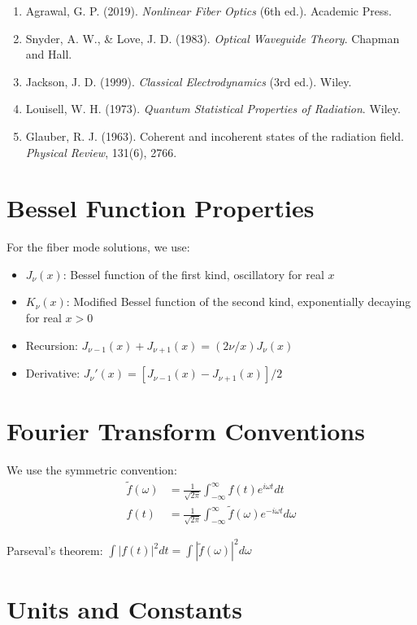 \documentclass[12pt,a4paper]{article}
\begin{document}
\begin{enumerate}[leftmargin=*]
\item Agrawal, G. P. (2019). \textit{Nonlinear Fiber Optics} (6th ed.). Academic Press.
\item Snyder, A. W., \& Love, J. D. (1983). \textit{Optical Waveguide Theory}. Chapman and Hall.
\item Jackson, J. D. (1999). \textit{Classical Electrodynamics} (3rd ed.). Wiley.
\item Louisell, W. H. (1973). \textit{Quantum Statistical Properties of Radiation}. Wiley.
\item Glauber, R. J. (1963). Coherent and incoherent states of the radiation field. \textit{Physical Review}, 131(6), 2766.
\end{enumerate}

\appendix

\section{Bessel Function Properties}

For the fiber mode solutions, we use:
\begin{itemize}[leftmargin=*]
\item $J_\nu(x)$: Bessel function of the first kind, oscillatory for real $x$
\item $K_\nu(x)$: Modified Bessel function of the second kind, exponentially decaying for real $x > 0$
\item Recursion: $J_{\nu-1}(x) + J_{\nu+1}(x) = (2\nu/x)J_\nu(x)$
\item Derivative: $J_\nu'(x) = [J_{\nu-1}(x) - J_{\nu+1}(x)]/2$
\end{itemize}

\section{Fourier Transform Conventions}

We use the symmetric convention:
\begin{align}
\tilde{f}(\omega) &= \frac{1}{\sqrt{2\pi}} \int_{-\infty}^{\infty} f(t) e^{i\omega t} dt \\
f(t) &= \frac{1}{\sqrt{2\pi}} \int_{-\infty}^{\infty} \tilde{f}(\omega) e^{-i\omega t} d\omega
\end{align}

Parseval's theorem: $\int |f(t)|^2 dt = \int |\tilde{f}(\omega)|^2 d\omega$

\section{Units and Constants}
\end{document}
